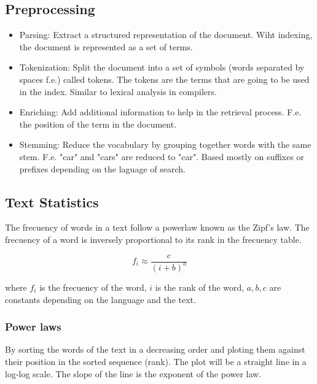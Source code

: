 \documentclass{article}
\begin{document}
\subsection{Preprocessing}
\begin{itemize}
    \item Parsing: Extract a structured representation of the document. Wiht indexing, the document is represented as a set of terms.
    \item Tokenization: Split the document into a set of symbols (words separated by spaces f.e.) called tokens. The tokens are the terms that are going to be used in the index.  Similar to lexical analysis in compilers.
    \item Enriching: Add additional information to help in the retrieval process. F.e. the position of the term in the document.
    \item Stemming: Reduce the vocabulary by grouping together words with the same stem. F.e. "car" and "cars" are reduced to "car". Based mostly on suffixes or prefixes depending on the laguage of search.
\end{itemize}
    
    \subsection{Text Statistics}
    The frecuency of words in a text follow a powerlaw known as the Zipf's law. The frecuency of a word is inversely proportional to its rank in the frecuency table.

    \begin{equation}
        f_i \approx \frac{c}{(i+b)^a}
    \end{equation}

    where $f_i$ is the frecuency of the word, $i$ is the rank of the word, $a, b, c$ are constants depending on the language and the text.

    \subsubsection{Power laws}
    By sorting the words of the text in a decreasing order and ploting them against their position in the sorted sequence (rank). The plot will be a straight line in a log-log scale. The slope of the line is the exponent of the power law.
\end{document}
